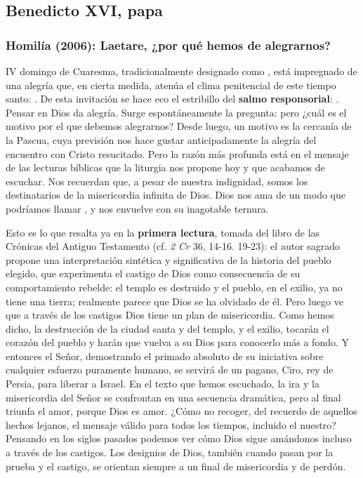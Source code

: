 \newsection
\subsection{Benedicto XVI, papa}

\subsubsection{Homilía (2006): Laetare, ¿por qué hemos de alegrarnos?}


\begin{body}
 IV domingo de Cuaresma, tradicionalmente designado como , está impregnado de una alegría que, en cierta medida, atenúa el clima penitencial de este tiempo santo: . De esta invitación se hace eco el estribillo del \textbf{salmo responsorial}: . Pensar en Dios da alegría. Surge espontáneamente la pregunta: pero ¿cuál es el motivo por el que debemos alegrarnos? Desde luego, un motivo es la cercanía de la Pascua, cuya previsión nos hace gustar anticipadamente la alegría del encuentro con Cristo resucitado. Pero la razón más profunda está en el mensaje de las lecturas bíblicas que la liturgia nos propone hoy y que acabamos de escuchar. Nos recuerdan que, a pesar de nuestra indignidad, somos los destinatarios de la misericordia infinita de Dios. Dios nos ama de un modo que podríamos llamar , y nos envuelve con su inagotable ternura.

Esto es lo que resalta ya en la \textbf{primera lectura}, tomada del libro de las Crónicas del Antiguo Testamento (cf. \textit{2 Cr} 36, 14-16. 19-23): el autor sagrado propone una interpretación sintética y significativa de la historia del pueblo elegido, que experimenta el castigo de Dios como consecuencia de su comportamiento rebelde: el templo es destruido y el pueblo, en el exilio, ya no tiene una tierra; realmente parece que Dios se ha olvidado de él. Pero luego ve que a través de los castigos Dios tiene un plan de misericordia. Como hemos dicho, la destrucción de la ciudad santa y del templo, y el exilio, tocarán el corazón del pueblo y harán que vuelva a su Dios para conocerlo más a fondo. Y entonces el Señor, demostrando el primado absoluto de su iniciativa sobre cualquier esfuerzo puramente humano, se servirá de un pagano, Ciro, rey de Persia, para liberar a Israel. En el texto que hemos escuchado, la ira y la misericordia del Señor se confrontan en una secuencia dramática, pero al final triunfa el amor, porque Dios es amor. ¿Cómo no recoger, del recuerdo de aquellos hechos lejanos, el mensaje válido para todos los tiempos, incluido el nuestro? Pensando en los siglos pasados podemos ver cómo Dios sigue amándonos incluso a través de los castigos. Los designios de Dios, también cuando pasan por la prueba y el castigo, se orientan siempre a un final de misericordia y de perdón.


\end{body}
